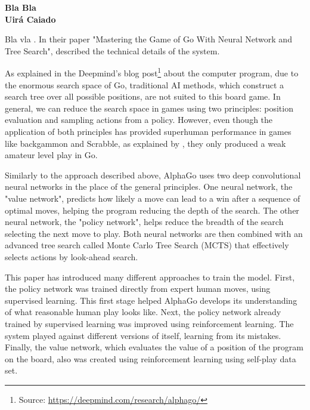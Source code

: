 \documentclass[a4paper]{article}
\begin{document}

\begin{center}

{\bf \large Bla Bla \\ \small Uirá Caiado}
\end{center}




Bla vla \cite{Economist2017a}. In their paper "Mastering the Game of Go With Neural Network and Tree Search", \cite{Silver:2016hl} described the technical details of the system.

As explained in the Deepmind's blog post\footnote{Source: \url{https://deepmind.com/research/alphago/}} about the computer program, due to the enormous search space of Go, traditional AI methods, which construct a search tree over all possible positions, are not suited to this board game. In general, we can reduce the search space in games using two principles: position evaluation and sampling actions from a policy. However, even though the application of both principles has provided superhuman performance in games like backgammon and Scrabble, as explained by \cite{Silver:2016hl}, they only produced a weak amateur level play in Go.

Similarly to the approach described above, AlphaGo uses two deep convolutional neural networks in the place of the general principles. One neural network, the "value network", predicts how likely a move can lead to a win after a sequence of optimal moves, helping the program reducing the depth of the search. The other neural network, the "policy network", helps reduce the breadth of the search selecting the next move to play. Both neural networks are then combined with an advanced tree search called Monte Carlo Tree Search (MCTS) that effectively selects actions by look-ahead search.

This paper has introduced many different approaches to train the model. First, the policy network was trained directly from expert human moves, using supervised learning. This first stage helped AlphaGo develops its understanding of what reasonable human play looks like. Next, the policy network already trained by supervised learning was improved using reinforcement learning. The system played against different versions of itself, learning from its mistakes. Finally, the value network, which evaluates the value of a position of the program on the board, also was created using reinforcement learning using self-play data set.
\end{document}
